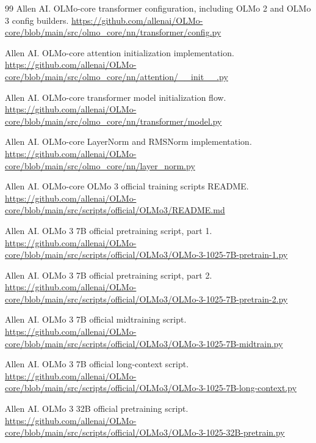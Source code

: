 \documentclass[UTF8,a4paper,11pt]{ctexart}
\begin{document}
\begin{thebibliography}{99}
Allen AI.
\newblock OLMo-core transformer configuration, including OLMo 2 and OLMo 3 config builders.
\newblock \url{https://github.com/allenai/OLMo-core/blob/main/src/olmo_core/nn/transformer/config.py}

Allen AI.
\newblock OLMo-core attention initialization implementation.
\newblock \url{https://github.com/allenai/OLMo-core/blob/main/src/olmo_core/nn/attention/__init__.py}

Allen AI.
\newblock OLMo-core transformer model initialization flow.
\newblock \url{https://github.com/allenai/OLMo-core/blob/main/src/olmo_core/nn/transformer/model.py}

Allen AI.
\newblock OLMo-core LayerNorm and RMSNorm implementation.
\newblock \url{https://github.com/allenai/OLMo-core/blob/main/src/olmo_core/nn/layer_norm.py}

Allen AI.
\newblock OLMo-core OLMo 3 official training scripts README.
\newblock \url{https://github.com/allenai/OLMo-core/blob/main/src/scripts/official/OLMo3/README.md}

Allen AI.
\newblock OLMo 3 7B official pretraining script, part 1.
\newblock \url{https://github.com/allenai/OLMo-core/blob/main/src/scripts/official/OLMo3/OLMo-3-1025-7B-pretrain-1.py}

Allen AI.
\newblock OLMo 3 7B official pretraining script, part 2.
\newblock \url{https://github.com/allenai/OLMo-core/blob/main/src/scripts/official/OLMo3/OLMo-3-1025-7B-pretrain-2.py}

Allen AI.
\newblock OLMo 3 7B official midtraining script.
\newblock \url{https://github.com/allenai/OLMo-core/blob/main/src/scripts/official/OLMo3/OLMo-3-1025-7B-midtrain.py}

Allen AI.
\newblock OLMo 3 7B official long-context script.
\newblock \url{https://github.com/allenai/OLMo-core/blob/main/src/scripts/official/OLMo3/OLMo-3-1025-7B-long-context.py}

Allen AI.
\newblock OLMo 3 32B official pretraining script.
\newblock \url{https://github.com/allenai/OLMo-core/blob/main/src/scripts/official/OLMo3/OLMo-3-1025-32B-pretrain.py}

\end{thebibliography}
\end{document}
